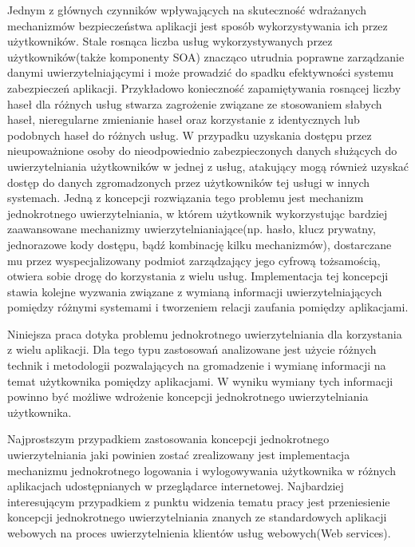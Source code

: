 Jednym z głównych czynników wpływających na skuteczność wdrażanych mechanizmów bezpieczeństwa aplikacji jest sposób wykorzystywania ich przez użytkowników. Stale rosnąca liczba usług wykorzystywanych przez użytkowników(także komponenty SOA) znacząco utrudnia poprawne zarządzanie danymi uwierzytelniającymi i może prowadzić do spadku efektywności systemu zabezpieczeń aplikacji. Przykładowo konieczność zapamiętywania rosnącej liczby haseł dla różnych usług stwarza zagrożenie związane ze stosowaniem słabych haseł, nieregularne zmienianie haseł oraz korzystanie z identycznych lub podobnych haseł do różnych usług. W przypadku uzyskania dostępu przez nieupoważnione osoby do nieodpowiednio zabezpieczonych danych służących do uwierzytelniania użytkowników w jednej z usług, atakujący mogą również uzyskać dostęp do danych zgromadzonych przez użytkowników tej usługi w innych systemach. Jedną z koncepcji rozwiązania tego problemu jest mechanizm jednokrotnego uwierzytelniania, w którem użytkownik wykorzystując bardziej zaawansowane mechanizmy uwierzytelnianiające(np. hasło, klucz prywatny, jednorazowe kody dostępu, bądź kombinację kilku mechanizmów), dostarczane mu przez wyspecjalizowany podmiot zarządzający jego cyfrową tożsamością, otwiera sobie drogę do korzystania z wielu usług. Implementacja tej koncepcji stawia kolejne wyzwania związane z wymianą informacji uwierzytelniających pomiędzy różnymi systemami i tworzeniem relacji zaufania pomiędzy aplikacjami.


\label{sec:celePracy}

	Niniejsza praca dotyka problemu jednokrotnego uwierzytelniania dla korzystania z wielu aplikacji. Dla tego typu zastosowań analizowane jest użycie różnych technik i metodologii pozwalających na gromadzenie i wymianę informacji na temat użytkownika pomiędzy aplikacjami. W wyniku wymiany tych informacji powinno być możliwe wdrożenie koncepcji jednokrotnego uwierzytelniania użytkownika.

	Najprostszym przypadkiem zastosowania koncepcji jednokrotnego uwierzytelniania jaki powinien zostać zrealizowany jest implementacja mechanizmu jednokrotnego logowania i wylogowywania użytkownika w różnych aplikacjach udostępnianych w przeglądarce internetowej. Najbardziej interesującym przypadkiem z punktu widzenia tematu pracy jest przeniesienie koncepcji jednokrotnego uwierzytelniania znanych ze standardowych aplikacji webowych na proces uwierzytelnienia klientów usług webowych(Web services).

